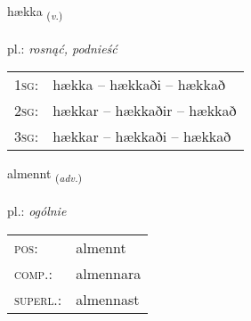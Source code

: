 \documentclass[frontgrid, backgrid]{flacards}\usepackage[]{graphicx}\usepackage[]{xcolor}
\begin{document}
\renewcommand{\blhead}{\vskip5pt {\small\bfseries\footnotesize Sagnorð | Verb }}
\renewcommand{\bcfoot}{\vskip5pt \hspace{2pt}{\small\bfseries\footnotesize 1K}}


{hækka \small{\textsubscript{(\textit{v.})}} \\[1ex] %
\textphonetic{[haihka]} \\
pl.: \emph{rosnąć, podnieść} \\  [2ex]
\renewcommand*{\arraystretch}{0.8}
\begin{tabular}{p{1cm}l}
\textsc{1sg}: & hækka -- hækkaði -- hækkað \\ 
\textsc{2sg}: & hækkar -- hækkaðir -- hækkað \\ 
\textsc{3sg}: & hækkar -- hækkaði -- hækkað \\ 
\end{tabular}
}

\renewcommand{\flhead}{\vskip5pt \fboxsep=0pt {\small\bfseries\footnotesize Atviksorð | Adverb}}
\renewcommand{\fcfoot}{\vskip5pt \fboxsep=0pt \hspace{2pt}{\small\bfseries\footnotesize 1K}}

\renewcommand{\blhead}{\vskip5pt {\small\bfseries\footnotesize Atviksorð | Adverb }}
\renewcommand{\bcfoot}{\vskip5pt \hspace{2pt}{\small\bfseries\footnotesize 1K}}


{almennt \small{\textsubscript{(\textit{adv.})}} \\[1ex] %
\textphonetic{[almɛn̥t]} \\
pl.: \emph{ogólnie} \\  [2ex]
\renewcommand*{\arraystretch}{0.8}
\begin{tabular}{ll}
\textsc{pos}: & almennt \\ 
\textsc{comp.}: & almennara \\ 
\textsc{superl.}: & almennast \\
\end{tabular}
}

\end{document}
